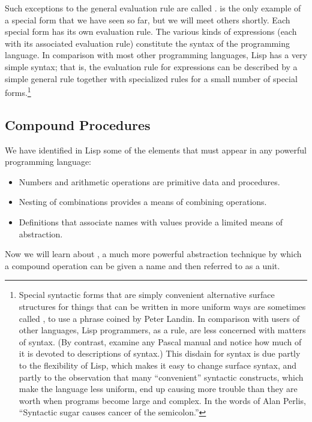Such exceptions to the general evaluation rule are called .   is the only example of a special form that we have seen
so far, but we will meet others shortly.  Each special form has its own
evaluation rule. The various kinds of expressions (each with its associated
evaluation rule) constitute the syntax of the programming language.  In
comparison with most other programming languages, Lisp has a very simple
syntax; that is, the evaluation rule for expressions can be described by a
simple general rule together with specialized rules for a small number of
special forms.\footnote{Special syntactic forms that are simply convenient
alternative surface structures for things that can be written in more uniform
ways are sometimes called , to use a phrase coined by
Peter Landin.  In comparison with users of other languages, Lisp programmers,
as a rule, are less concerned with matters of syntax.  (By contrast, examine
any Pascal manual and notice how much of it is devoted to descriptions of
syntax.)  This disdain for syntax is due partly to the flexibility of Lisp,
which makes it easy to change surface syntax, and partly to the observation
that many ``convenient'' syntactic constructs, which make the language less
uniform, end up causing more trouble than they are worth when programs become
large and complex.  In the words of Alan Perlis, ``Syntactic sugar causes
cancer of the semicolon.''}

\subsection{Compound Procedures}
\label{Section 1.1.4}

We have identified in Lisp some of the elements that must appear in any
powerful programming language:

\begin{itemize}
\item
Numbers and arithmetic operations are primitive data and procedures.

\item
Nesting of combinations provides a means of combining operations.

\item
Definitions that associate names with values provide a limited means of
abstraction.
\end{itemize}

\noindent
Now we will learn about , a much more powerful
abstraction technique by which a compound operation can be given a name and
then referred to as a unit.

